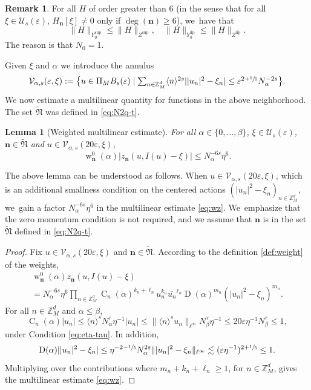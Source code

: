 \documentclass[10pt,a4paper]{amsart}
\let\ts\textstyle
\DeclareMathOperator{\rw}{w}
\theoremstyle{plain}
\newtheorem{lemma}[theorem]{Lemma}
\theoremstyle{definition}
\newtheorem{remark}[theorem]{Remark}
\newcommand{\nb}{{\boldsymbol n}}
\newcommand{\Nb}{{\boldsymbol{\mathfrak{N}}}}
\newcommand{\Z}{\mathbb{Z}}
\newcommand{\1}{\mathbf{1}}
\newcommand{\Ysup}[1]{Y_{#1}^{\mathrm{sup}}}
\newcommand{\Ylip}[1]{Y_{#1}^{\mathrm{lip}}}
\let\epsilon\varepsilon
\begin{document}
\begin{remark}
For all $H$ of order greater than 6 (in the sense that for all $\xi\in\mathcal{U}_{s}(\epsilon)$, $H_{\nb}[\xi]\neq0$ only if $\deg(\nb)\geq6$), we~have that
\begin{equation}
\label{eq:alpha=0}
\|H\|_{\Ysup{0}}
\leq \|H\|_{Z^{\mathrm{sup}}},\quad
\|H\|_{\Ylip{0}}
\leq \|H\|_{Z^{\mathrm{lip}}}.
\end{equation}
The reason is that $N_{0}=1$.
\end{remark}
Given $\xi$ and $\alpha$ we introduce the annulus
\begin{equation}
\label{eq:cal-V}\ts
\mathcal{V}_{\alpha,s}(\epsilon,\xi) := \big\{u\in\Pi_{M}B_{s}(\epsilon)\mid \sum_{n\in\Z_{M}^{d}}\langle n\rangle^{2s}||u_n|^2 - \xi_n|\leq \epsilon^{2+\sfrac{1}{5}}N_\alpha^{-2s}\big\}.
\end{equation}
We now estimate a multilinear quantity for functions in the above neighborhood. The set $\widetilde{\Nb}$ was defined in \eqref{eq:N2q-t}.
\begin{lemma}[Weighted multilinear estimate]
\label{lem:wz}
For all $\alpha\in\{0,\dots,\beta\}$, $\xi\in\mathcal{U}_{s}(\epsilon)$, $\nb\in\widetilde{\Nb}$ and $u\in\mathcal{V}_{\alpha,s}(20\epsilon,\xi)$,
\begin{equation}
\label{eq:wz}
\rw_{\nb}^{0}(\alpha)|z_{\nb}(u,I(u)-\xi)|
\leq N_{\alpha}^{-6s}\eta^{6}.
\end{equation}
\end{lemma}
The above lemma can be understood as follows. When $u\in\mathcal{V}_{\alpha,s}(20\epsilon,\xi)$, which is an additional smallness condition on the centered actions $(|u_{n}|^{2}-\xi_{n})_{n\in\Z_{M}^{d}}$, we~gain a factor $N_{\alpha}^{-6s}\eta^{6}$ in the multilinear estimate \eqref{eq:wz}. We~emphasize that the zero momentum condition is not required, and we assume that $\nb$ is in the set $\widetilde{\Nb}$ defined in \eqref{eq:N2q-t}.

\begin{proof}
Fix $u\in\mathcal{V}_{\alpha,s}(20\epsilon,\xi)$ and $\nb\in\widetilde{\Nb}$. According to the definition \ref{def:weight} of the weights,
\begin{multline}
\label{eq:wz2}
\rw_{\nb}^{0}(\alpha)z_{\nb}(u,I(u)-\xi)\\
= N_{\alpha}^{-6s}\eta^{6}\prod_{n\in\Z_{M}^{d}}\operatorname{C}_{n}(\alpha)^{k_{n}+\ell_{n}}u_{n}^{k_{n}}\overline{u_{n}}^{\ell_{n}}\operatorname{D}(\alpha)^{m_{n}}(|u_{n}|^{2}-\xi_{n})^{m_{n}}.
\end{multline}
For all $n\in\Z_{M}^{d}$ and $\alpha\leq\beta$,
\[
\operatorname{C}_{n}(\alpha)|u_{n}|
\leq \langle n\rangle^{s}N_{\alpha}^{\tau}\eta^{-1}|u_{n}|
\leq \|\langle n\rangle^{s}u_{n}\|_{\ell^{\infty}}N_{\beta}^{\tau}\eta^{-1}
\leq 20\epsilon\eta^{-1} N_{\beta}^{\tau}
\leq 1,
\]
under Condition \eqref{eq:eta-tau}. In addition,
\[
\operatorname{D}(\alpha)||u_{n}|^{2}-\xi_{n}| \leq \eta^{-2-\sfrac{1}{5}}N_{\alpha}^{2s}\||u_{n}|^{2}-\xi_{n}\|_{\ell^{\infty}}
\lesssim (\epsilon\eta^{-1})^{2+\sfrac{1}{5}}\leq1.
\]
Multiplying over the contributions where $m_{n}+k_{n}+\ell_{n}\geq1$, for $n\in\Z_{M}^{d}$, gives the multilinear estimate \eqref{eq:wz}.
\end{proof}
\end{document}
